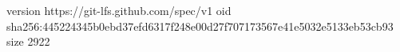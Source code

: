version https://git-lfs.github.com/spec/v1
oid sha256:445224345b0ebd37efd6317f248e00d27f707173567e41e5032e5133eb53cb93
size 2922
